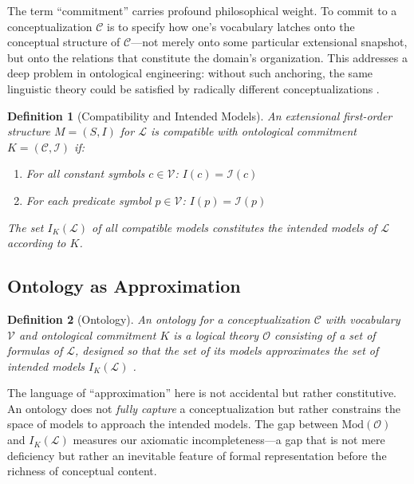 \documentclass[11pt,a4paper]{article}
\newtheorem{definition}{Definition}[section]
\newcommand{\vocab}{\mathcal{V}}
\newcommand{\lang}{\mathcal{L}}
\newcommand{\interp}{\mathcal{I}}
\newcommand{\concept}{\mathcal{C}}
\newcommand{\onto}{\mathcal{O}}
\begin{document}
The term ``commitment'' carries profound philosophical weight. To commit to a conceptualization $\concept$ is to specify how one's vocabulary latches onto the conceptual structure of $\concept$---not merely onto some particular extensional snapshot, but onto the relations that constitute the domain's organization. This addresses a deep problem in ontological engineering: without such anchoring, the same linguistic theory could be satisfied by radically different conceptualizations \citep{guarino2009}.

\begin{definition}[Compatibility and Intended Models]
An extensional first-order structure $M = (S, I)$ for $\lang$ is \emph{compatible with} ontological commitment $K = (\concept, \interp)$ if:
\begin{enumerate}
    \item For all constant symbols $c \in \vocab$: $I(c) = \interp(c)$
    \item For each predicate symbol $p \in \vocab$: $I(p) = \interp(p)$
\end{enumerate}
The set $I_K(\lang)$ of all compatible models constitutes the \emph{intended models of $\lang$ according to $K$}.
\end{definition}

\subsection{Ontology as Approximation}

\begin{definition}[Ontology]
An \emph{ontology} for a conceptualization $\concept$ with vocabulary $\vocab$ and ontological commitment $K$ is a logical theory $\onto$ consisting of a set of formulas of $\lang$, designed so that the set of its models approximates the set of intended models $I_K(\lang)$ \citep{gruber1993, guarino1998}.
\end{definition}

The language of ``approximation'' here is not accidental but rather constitutive. An ontology does not \emph{fully capture} a conceptualization but rather constrains the space of models to approach the intended models. The gap between $\text{Mod}(\onto)$ and $I_K(\lang)$ measures our axiomatic incompleteness---a gap that is not mere deficiency but rather an inevitable feature of formal representation before the richness of conceptual content.

\end{document}
